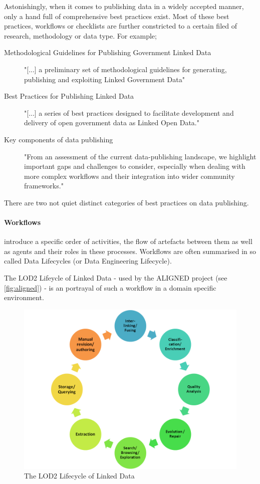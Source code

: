 \documentclass[a4paper,english,twoside,BCOR1.5cm,headsepline,DIV12,appendixprefix,final,12pt]{scrbook}
\begin{document}
Astonishingly, when it comes to publishing data in a widely accepted manner, only a hand full of comprehensive best practices exist. Most of these best practices, workflows or checklists are further constricted to a certain filed of research, methodology or data type. For example;

\begin{description}
\item[Methodological Guidelines for Publishing
Government Linked Data] "[...] a preliminary set of methodological guidelines for generating, publishing and exploiting Linked Government Data" \cite{Terrazas}
\item[Best Practices for Publishing Linked Data] "[...] a series of best practices designed to facilitate development and delivery of open government data as Linked Open Data." \cite{Hyland:14:BPP}
\item[Key components of data publishing] "From an assessment of the current data-publishing landscape, we highlight important gaps and challenges to consider, especially when dealing with more complex workflows and their integration into wider community frameworks." \cite{austin_2015_34542}
\item[] 
\end{description}

There are two not quiet distinct categories of best practices on data publishing. 

\paragraph{Workflows} introduce a specific order of activities, the flow of artefacts between them as well as agents and their roles in these processes. Workflows are often summarised in so called Data Lifecycles (or Data Engineering Lifecycle).

The LOD2 Lifeycle of Linked Data \cite{AuerBDEHILMMNSTW12} - used by the ALIGNED project (see \cref{fig:aligned}) - is an portrayal of such a workflow in a domain specific environment.

\begin{figure}[!htbp]
\centering
  \includegraphics[width=12cm]{images/lod2lifecycle.png}
  \caption{The LOD2 Lifecycle of Linked Data \cite{AuerBDEHILMMNSTW12}}
  \label{fig:lod2lifecycle}
\end{figure}
\end{document}
